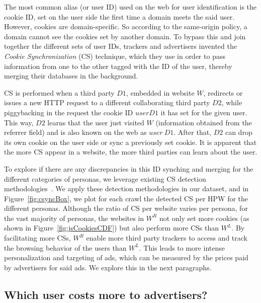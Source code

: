 \documentclass{article}
\newcommand{\hpw}{HPW\xspace}
\begin{document}
The most common alias (or user ID) used on the web for user identification is the cookie ID, set on the user side the first time a domain meets the said user.
However, cookies are domain-specific.
So according to the same-origin policy, a domain cannot see the cookies set by another domain.
To bypass this and join together the different sets of user IDs, trackers and advertisers invented the \emph{Cookie Synchronization} (CS) technique, which they use in order to pass information from one to the other tagged with the ID of the user, thereby merging their databases in the background.

CS is performed when a third party $D1$, embedded in website $W$, redirects or issues a new HTTP request to a different collaborating third party $D2$, while piggybacking in the request the cookie ID $userD1$ it has set for the given user.
This way, $D2$ learns that the user just visited $W$ (information obtained from the referrer field) and is also known on the web as $user~D1$.
After that, $D2$ can drop its own cookie on the user side or sync a previously set cookie.
It is apparent that the more CS appear in a website, the more third parties can learn about the user.

To explore if there are any discrepancies in this ID synching and merging for the different categories of personas, we leverage 
existing CS detection methodologies~\cite{acar2014web,panpap_www2019}.
We apply these detection methodologies in our dataset, and in Figure~\ref{fig:csyncBox}, we plot for each crawl the detected CS per \hpw for the different personas. 
Although the ratio of CS per website varies per persona, for the vast majority of personas, the websites in $W^R$ not only set more cookies (as shown in Figure~\ref{fig:jsCookiesCDF}) but also perform more CSs than $W^L$.
By facilitating more CSs, $W^R$ enable more third party trackers to access and track the browsing behavior of the users than $W^L$.
This leads to more intense personalization and targeting of ads, which can be measured by the prices paid by advertisers for said ads.
We explore this in the next paragraphs.

\subsection{Which user costs more to advertisers?}\label{sec:prices}
\end{document}
